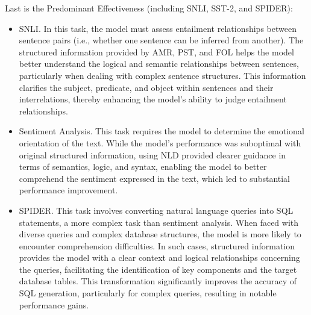 Last is the Predominant Effectiveness (including SNLI, SST-2, and SPIDER):
\begin{itemize}
  \item SNLI. In this task, the model must assess entailment relationships between sentence pairs (i.e., whether one sentence can be inferred from another). The structured information provided by AMR, PST, and FOL helps the model better understand the logical and semantic relationships between sentences, particularly when dealing with complex sentence structures. This information clarifies the subject, predicate, and object within sentences and their interrelations, thereby enhancing the model’s ability to judge entailment relationships.
  \item Sentiment Analysis. This task requires the model to determine the emotional orientation of the text. While the model's performance was suboptimal with original structured information, using NLD provided clearer guidance in terms of semantics, logic, and syntax, enabling the model to better comprehend the sentiment expressed in the text, which led to substantial performance improvement.
  \item SPIDER. This task involves converting natural language queries into SQL statements, a more complex task than sentiment analysis. When faced with diverse queries and complex database structures, the model is more likely to encounter comprehension difficulties. In such cases, structured information provides the model with a clear context and logical relationships concerning the queries, facilitating the identification of key components and the target database tables. This transformation significantly improves the accuracy of SQL generation, particularly for complex queries, resulting in notable performance gains.
\end{itemize}


